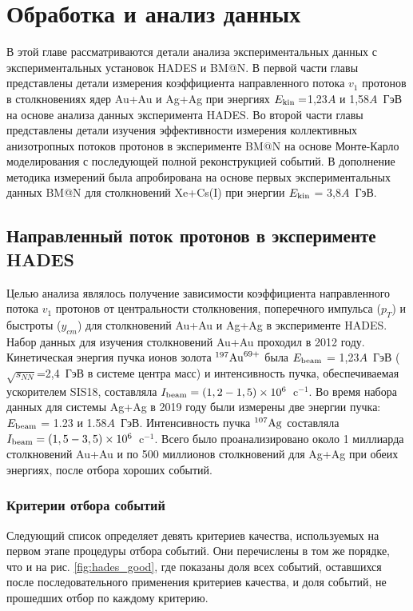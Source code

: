 \chapter{Обработка и анализ данных}

В этой главе рассматриваются детали анализа экспериментальных данных с экспериментальных установок HADES  и  BM@N.
В первой части главы представлены детали измерения коэффициента  направленного потока $v_1$ протонов в столкновениях ядер  Au+Au и Ag+Ag при энергиях $E_{\rm kin}=$1,23$A$ и 1,58$A$~ГэВ на основе анализа данных эксперимента HADES.
Во второй части главы представлены детали изучения эффективности измерения коллективных анизотропных потоков протонов в эксперименте  BM@N  на основе  Монте-Карло моделирования с последующей полной реконструкцией событий. 
В дополнение методика измерений была апробирована на основе первых экспериментальных данных BM@N для столкновений Xe+Cs(I) при энергии $E_{\rm kin}$ = 3,8$A$~ГэВ. 

\section{Направленный поток протонов в эксперименте HADES}

Целью анализа являлось получение зависимости коэффициента направленного потока $v_1$ протонов от центральности столкновения, поперечного импульса ($p_T$) и быстроты ($y_{cm}$) 
для столкновений Au+Au  и Ag+Ag  в эксперименте HADES.  Набор данных для изучения столкновений Au+Au проходил в 2012 году. 
Кинетическая энергия пучка ионов
золота  $^{197}{\rm Au}^{69+}$  была $E_{\rm beam}$ = 1,23$A$~ГэВ ($\sqrt{s_{NN}}$=2,4~ГэВ в системе центра масс) и интенсивность пучка, обеспечиваемая ускорителем SIS18, составляла $I_{\rm beam} = (1,2 - 1,5) \times 10^{6}$~c$^{-1}$.
Во время набора данных для системы  Ag+Ag  в 2019 году были измерены две энергии пучка: $E_{\rm beam}$ = 1.23 и 1.58$A$~ГэВ. Интенсивность пучка $^{107}{\rm Ag}$ составляла $I_{\rm beam} = (1,5 - 3,5) \times 10^{6}$~c$^{-1}$.
Всего было проанализировано около 1 миллиарда столкновений Au+Au и по 500 миллионов столкновений для Ag+Ag при обеих энергиях, после отбора хороших событий.

\subsection{Критерии отбора событий}

Следующий список определяет девять критериев качества, используемых на первом этапе процедуры отбора событий.
Они перечислены в том же порядке, что и на рис. \ref{fig:hades_good}, где показаны доля всех  событий, оставшихся  после последовательного применения критериев качества, и доля событий, не прошедших отбор по каждому критерию.

